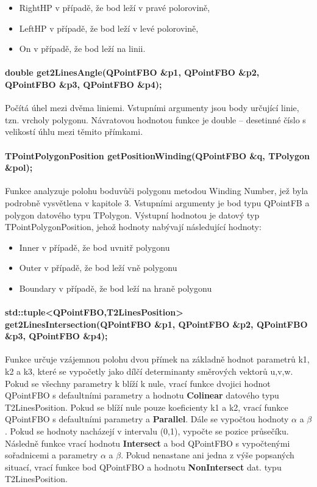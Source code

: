 \documentclass[11pt]{article}
\begin{document}
\begin{itemize}
\item RightHP v případě, že bod leží v pravé polorovině,
\item LeftHP v případě, že  bod leží v levé polorovině,
\item On v případě, že bod leží na linii.
\end{itemize}

\paragraph{double get2LinesAngle(QPointFBO \&p1, QPointFBO \&p2, QPointFBO \&p3, QPointFBO \&p4);}
Počítá úhel mezi dvěma liniemi. Vstupními argumenty jsou body určující linie, tzn. vrcholy polygonu. Návratovou hodnotou funkce je double – desetinné číslo s velikostí úhlu mezi těmito přímkami.  

\paragraph{TPointPolygonPosition getPositionWinding(QPointFBO \&q, TPolygon \&pol);}
Funkce analyzuje polohu boduvůči polygonu metodou Winding Number, jež byla podrobně vysvětlena v kapitole 3.  Vstupními argumenty je bod typu QPointFB a polygon datového typu TPolygon. Výstupní hodnotou je datový typ TPointPolygonPosition, jehož hodnoty nabývají následující hodnoty: 

\begin{itemize}
\item Inner v případě, že bod uvnitř polygonu
\item Outer v případě, že  bod leží vně polygonu
\item Boundary v případě, že bod leží na hraně polygonu
\end{itemize}

\paragraph{std::tuple<QPointFBO,T2LinesPosition> get2LinesIntersection(QPointFBO \&p1, QPointFBO \&p2, QPointFBO \&p3, QPointFBO \&p4);}
Funkce určuje vzájemnou polohu dvou přímek na základně hodnot parametrů k1, k2 a k3, které se vypočetly jako dílčí determinanty směrových vektorů u,v,w.
Pokud se všechny parametry k blíží k nule, vrací funkce dvojici hodnot QPointFBO s defaultními parametry a hodnotu \textbf{Colinear} datového typu T2LinesPosition. Pokud se blíží nule pouze koeficienty k1 a k2, vrací funkce QPointFBO s defaultními parametry a \textbf{Parallel}. Dále se vypočtou hodnoty $\alpha$ a $\beta$. Pokud se hodnoty nacházejí v intervalu (0,1), vypočte se pozice průsečíku. Následně funkce vrací hodnotu \textbf{Intersect} a bod QPointFBO s vypočtenými sořadnicemi a parametry $\alpha$ a $\beta$. Pokud nenastane ani jedna z výše popsaných situací, vrací funkce bod QPointFBO a hodnotu \textbf{NonIntersect} dat. typu T2LinesPosition.
\end{document}
